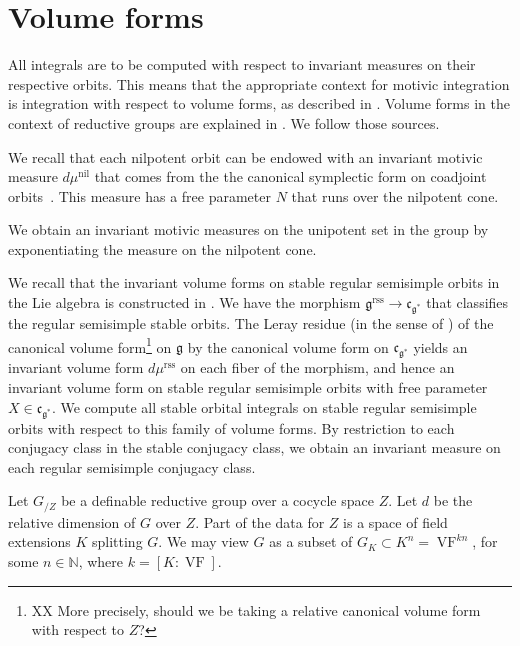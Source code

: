 \documentclass[12pt]{amsart}
\newcommand{\op}[1]{\operatorname{#1}}
\newcommand{\ring}[1]{{\mathbb #1}}
\def\VF{{\op{VF}}}
\newcommand{\fg}{\mathfrak{g}}
\newcommand{\fc}{\mathfrak{c}}
\newcommand{\reg}{\mathrm{rss}}
\theoremstyle{plain}
\theoremstyle{definition}
\begin{document}
\section{Volume forms}\label{sec:volume}

All integrals are to be computed with respect to invariant measures on
their respective orbits.  This means that the appropriate context for
motivic integration is integration with respect to volume forms, as
described in \cite[Sec. 8]{CL}.    Volume forms in the context of
reductive groups are explained in \cite{CGH}.  We follow
those sources.

We recall that each nilpotent orbit can be endowed with an invariant
motivic measure $d\mu^{\op{nil}}$ that comes from the the canonical
symplectic form on coadjoint orbits~\cite[Prop.~4.3]{CGH}.  This
measure has a free parameter $N$ that runs over the nilpotent cone.

We obtain an invariant motivic measures on the unipotent set in the
group by exponentiating the measure on the nilpotent cone.

We recall that the invariant volume forms on stable regular semisimple
orbits in the Lie algebra is constructed in \cite{CHL}.  We have the
morphism $\fg^\reg\to\fc_{\fg^*}$ that classifies the regular
semisimple stable orbits.  The Leray residue (in the sense of
\cite{CL}) of the canonical volume form\footnote{XX More precisely,
  should we be taking a relative canonical volume form with respect to
  $Z$?} on $\fg$ by the canonical volume form on $\fc_{\fg^*}$ yields
an invariant volume form $d\mu^\reg$ on each fiber of the morphism,
and hence an invariant volume form on stable regular semisimple orbits
with free parameter $X\in\fc_{\fg^*}$.  We compute all stable orbital
integrals on stable regular semisimple orbits with respect to this
family of volume forms.  By restriction to each conjugacy class in the
stable conjugacy class, we obtain an invariant measure on each regular
semisimple conjugacy class.

Let $G_{/Z}$ be a definable reductive group over a cocycle space $Z$.
Let $d$ be the relative dimension of $G$ over $Z$.  Part of the data
for $Z$ is a space of field extensions $K$ splitting $G$.  We may view
$G$ as a subset of $G_K\subset K^n = \VF^{kn}$, for some $n\in\ring{N}$, where
$k=[K:\VF]$.
\end{document}

